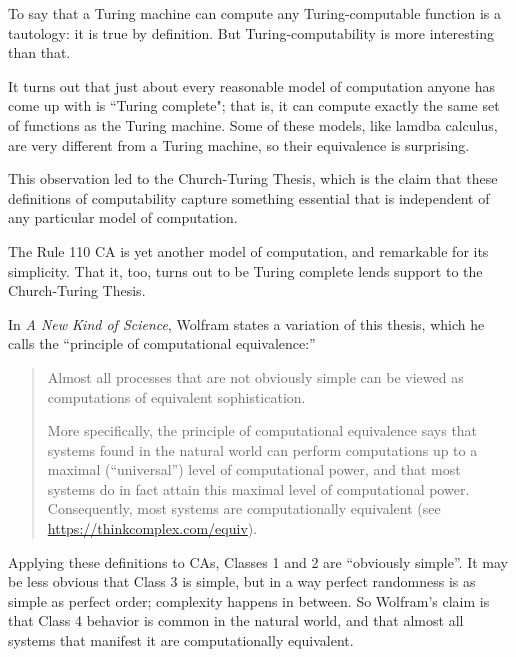 \documentclass[12pt]{book}
\theoremstyle{exercise}
\begin{document}

To say that a Turing machine can compute any Turing-computable
function is a tautology: it is true by definition.  But
Turing-computability is more interesting than that.


It turns out that just about every reasonable model of computation
anyone has come up with is ``Turing complete"; that is, it can compute
exactly the same set of functions as the Turing machine.
Some of these models, like lamdba calculus, are very different
from a Turing machine, so their equivalence is surprising.


This observation led to the Church-Turing Thesis, which is the claim that these definitions of computability capture something essential that is independent of any particular model of computation.

The Rule 110 CA is yet another model of computation, and remarkable
for its simplicity.  That it, too, turns out to be Turing complete lends
support to the Church-Turing Thesis.

In {\em A New Kind of Science}, Wolfram states a variation of this
thesis, which he calls the ``principle of computational equivalence:''


\begin{quote}
Almost all processes that are not obviously simple can be viewed as
computations of equivalent sophistication.

More specifically, the principle of computational equivalence says
that systems found in the natural world can perform computations up to
a maximal (``universal'') level of computational power, and that most
systems do in fact attain this maximal level of computational
power. Consequently, most systems are computationally
equivalent (see
  \url{https://thinkcomplex.com/equiv}).
\end{quote}

Applying these definitions to CAs, Classes 1 and 2 are ``obviously
simple''.  It may be less obvious that Class 3 is simple, but in a way
perfect randomness is as simple as perfect order; complexity happens
in between.  So Wolfram's claim is that Class 4 behavior is common in
the natural world, and that almost all systems that manifest it
are computationally equivalent.
\end{document}
